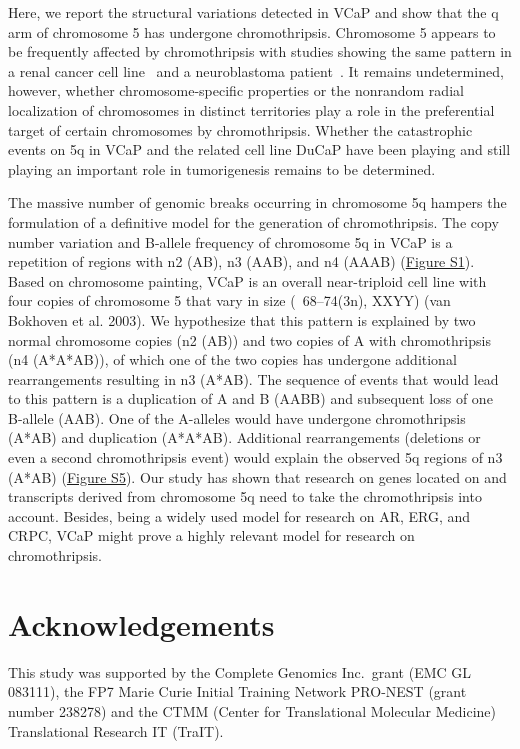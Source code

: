 Here, we report the structural variations detected in VCaP and show that the q arm of chromosome 5 has undergone chromothripsis.
Chromosome 5 appears to be frequently affected by chromothripsis with studies showing the same pattern in a renal cancer cell line~\cite{stephens2011massive} and a neuroblastoma patient~\cite{molenaar2012sequencing}. It remains undetermined, however, whether chromosome-specific
properties or the nonrandom radial localization of chromosomes in distinct territories play a role in the preferential target of certain
chromosomes by chromothripsis. Whether the catastrophic events on 5q in VCaP and the related cell line DuCaP have been playing and still
playing an important role in tumorigenesis remains to be determined.

The massive number of genomic breaks occurring in chromosome 5q hampers the formulation of a definitive model for the generation of chromothripsis.
The copy number variation and B-allele frequency of chromosome 5q in VCaP is a repetition of regions with n2 (AB), n3 (AAB), and n4 (AAAB) (\href{https://link.springer.com/article/10.1007/s00439-013-1308-1#SupplementaryMaterial}{Figure S1}).
Based on chromosome painting, VCaP is an overall near-triploid cell line with four copies of chromosome 5 that vary in size (~68–74(3n), XXYY)
(van Bokhoven et al. 2003). We hypothesize that this pattern is explained by two normal chromosome copies (n2 (AB)) and two copies of A with
chromothripsis (n4 (A*A*AB)), of which one of the two copies has undergone additional rearrangements resulting in n3 (A*AB). The sequence of
events that would lead to this pattern is a duplication of A and B (AABB) and subsequent loss of one B-allele (AAB). One of the A-alleles would
have undergone chromothripsis (A*AB) and duplication (A*A*AB). Additional rearrangements (deletions or even a second chromothripsis event) would
explain the observed 5q regions of n3 (A*AB) (\href{https://link.springer.com/article/10.1007/s00439-013-1308-1#SupplementaryMaterial}{Figure S5}). Our study has shown that research on genes located on and transcripts derived from
chromosome 5q need to take the chromothripsis into account. Besides, being a widely used model for research on AR, ERG, and CRPC, VCaP might
prove a highly relevant model for research on chromothripsis.

\section*{Acknowledgements}
This study was supported by the Complete Genomics Inc.\ grant (EMC GL 083111), the FP7 Marie Curie Initial Training Network PRO-NEST
(grant number 238278) and the CTMM (Center for Translational Molecular Medicine) Translational Research IT (TraIT).

%





